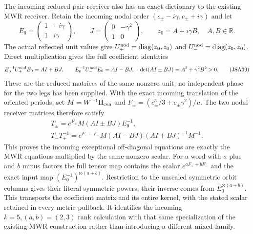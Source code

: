 \documentclass[11pt,a4paper]{article}
\newcommand{\diag}{\operatorname{diag}}
\begin{document}
The incoming reduced pair receiver also has an exact dictionary
to the existing MWR receiver. Retain the incoming nodal order
$(c_\pm-i\gamma,c_\pm+i\gamma)$ and let
\[
 E_0=\begin{pmatrix}1&-i\gamma\\1&i\gamma\end{pmatrix},\qquad
 J=\begin{pmatrix}0&-\gamma^2\\1&0\end{pmatrix},\qquad
 z_0=A+i\gamma B,\quad A,B\in\mathbb R.
\]
The actual reflected unit values give
$U_+^{\rm nod}=\diag(\overline z_0,z_0)$ and
$U_-^{\rm nod}=\diag(z_0,\overline z_0)$. Direct multiplication
gives the full coefficient identities
\[
 E_0^{-1}U_+^{\rm nod}E_0=AI+BJ,\qquad
 E_0^{-1}U_-^{\rm nod}E_0=AI-BJ,
 \quad\det(AI\pm BJ)=A^2+\gamma^2B^2>0.
\tag{JSA39}
\]
These are the reduced matrices of the same nonzero unit; no
independent phase for the two legs has been supplied. With the
exact incoming translation of the oriented periods, set
$M=W^{-1}\Pi_{\rm cen}$ and
$F_\pm=(c_\pm^3/3+c_\pm\gamma^2)/u$. The two nodal receiver
matrices therefore satisfy
\[
\begin{gathered}
 T_\pm=e^{F_\pm}M(AI\pm BJ)E_0^{-1},\\
 T_-T_+^{-1}=e^{F_--F_+}
       M(AI-BJ)(AI+BJ)^{-1}M^{-1}.
\end{gathered}\tag{JSA40}
\]
This proves the incoming exceptional off-diagonal equations are
exactly the MWR equations multiplied by the same nonzero scalar.
For a word with $a$ plus and $b$ minus factors the full tensor
map contains the scalar $e^{aF_++bF_-}$ and the exact input map
$(E_0^{-1})^{\otimes(a+b)}$. Restriction to the unscaled symmetric
orbit columns gives their literal symmetric powers; their inverse
comes from $E_0^{\otimes(a+b)}$. This transports the coefficient
matrix and its entire kernel, with the stated scalar retained in
every metric pullback. It identifies the incoming $k=5,(a,b)=(2,3)$
rank calculation with that same specialization of the existing
MWR construction rather than introducing a different mixed family.
\end{document}
